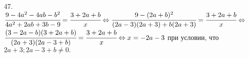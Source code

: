 47. $\cfrac{9-4a^2-4ab-b^2}{4a^2+2ab+3b-9}=\cfrac{3+2a+b}{x}\Leftrightarrow
\cfrac{9-(2a+b)^2}{(2a-3)(2a+3)+b(2a+3)}=\cfrac{3+2a+b}{x}\Leftrightarrow$\\$
\cfrac{(3-2a-b)(3+2a+b)}{(2a+3)(2a-3+b)}=\cfrac{3+2a+b}{x}\Leftrightarrow
x=-2a-3$ при условии, что $2a+3; 2a-3+b\neq0.$\\
